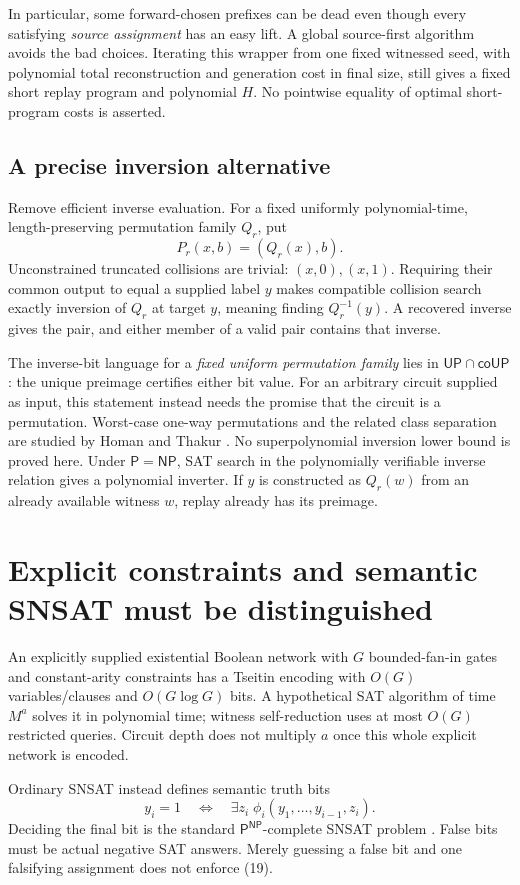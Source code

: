 \documentclass[11pt]{article}
\begin{document}
In particular, some forward-chosen prefixes can be dead even though
every satisfying \emph{source assignment} has an easy lift.
A global source-first algorithm avoids the bad choices.
Iterating this wrapper from one fixed witnessed seed, with polynomial
total reconstruction and generation cost in final size, still gives
a fixed short replay program and polynomial $H$.
No pointwise equality of optimal short-program costs is asserted.

\subsection*{A precise inversion alternative}
Remove efficient inverse evaluation. For a fixed uniformly
polynomial-time, length-preserving permutation family $Q_r$, put
\[
 P_r(x,b)=(Q_r(x),b).
\]
Unconstrained truncated collisions are trivial:
$(x,0),(x,1)$. Requiring their common output to equal a supplied label
$y$ makes compatible collision search exactly inversion of $Q_r$ at
target $y$, meaning finding $Q_r^{-1}(y)$.
A recovered inverse gives the pair, and either member of a valid pair
contains that inverse.

The inverse-bit language for a \emph{fixed uniform permutation family}
lies in $\mathsf{UP}\cap\mathsf{coUP}$: the unique preimage certifies
either bit value. For an arbitrary circuit supplied as input, this
statement instead needs the promise that the circuit is a permutation.
Worst-case one-way permutations and the related class separation are
studied by Homan and Thakur \cite{homan2003}.
No superpolynomial inversion lower bound is proved here.
Under $\mathsf P=\mathsf{NP}$, SAT search in the polynomially verifiable
inverse relation gives a polynomial inverter.
If $y$ is constructed as $Q_r(w)$ from an already available witness $w$,
replay already has its preimage.

\section{Explicit constraints and semantic SNSAT must be distinguished}
An explicitly supplied existential Boolean network with $G$ bounded-fan-in
gates and constant-arity constraints has a Tseitin encoding with $O(G)$ variables/clauses and
$O(G\log G)$ bits. A hypothetical SAT algorithm of time $M^a$ solves it
in polynomial time; witness self-reduction uses at most $O(G)$
restricted queries. Circuit depth does not multiply $a$ once this
whole explicit network is encoded.

Ordinary SNSAT instead defines semantic truth bits
\[
 y_i=1\quad\Longleftrightarrow\quad
 \exists z_i\;\phi_i(y_1,\ldots,y_{i-1},z_i).
 \tag{19}
\]
Deciding the final bit is the standard $\mathsf P^{\mathsf{NP}}$-complete
SNSAT problem \cite{markey2003}. False bits must be actual negative SAT answers.
Merely guessing a false bit and one falsifying assignment does not
enforce (19).
\end{document}
